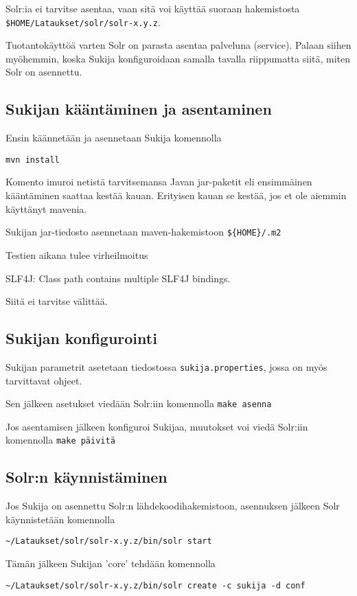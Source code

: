 \documentclass[12pt]{article}
\begin{document}
Solr:ia ei tarvitse asentaa, vaan sitä voi käyttää suoraan
hakemistosta \verb=$HOME/Lataukset/solr/solr-x.y.z=.

Tuotantokäyttöä varten Solr on parasta asentaa palveluna (service).
Palaan siihen myöhemmin, koska Sukija konfiguroidaan samalla tavalla
riippumatta siitä, miten Solr on asennettu.



\subsection*{Sukijan kääntäminen ja asentaminen}

Ensin käännetään ja asennetaan Sukija komennolla

\verb=mvn install=

Komento imuroi netistä tarvitsemansa Javan jar-paketit eli ensimmäinen
kääntäminen saattaa kestää kauan. Erityisen kauan se kestää, jos et
ole aiemmin käyttänyt mavenia.

Sukijan jar-tiedosto asennetaan maven-hakemistoon \verb|${HOME}/.m2|

Testien aikana tulee virheilmoitus

SLF4J: Class path contains multiple SLF4J bindings.

Siitä ei tarvitse välittää.


\subsection*{Sukijan konfigurointi}


Sukijan parametrit asetetaan tiedostossa \verb|sukija.properties|,
jossa on myös tarvittavat ohjeet.

Sen jälkeen asetukset viedään Solr:iin komennolla \verb|make asenna|

Jos asentamisen jälkeen konfiguroi Sukijaa, muutokset voi viedä
Solr:iin komennolla \verb|make päivitä|


\subsection*{Solr:n käynnistäminen}

Jos Sukija on asennettu Solr:n lähdekoodihakemistoon,
asennuksen jälkeen Solr käynnistetään komennolla

\verb|~/Lataukset/solr/solr-x.y.z/bin/solr start|

Tämän jälkeen Sukijan 'core' tehdään komennolla

\verb|~/Lataukset/solr/solr-x.y.z/bin/solr create -c sukija -d conf|
\end{document}
